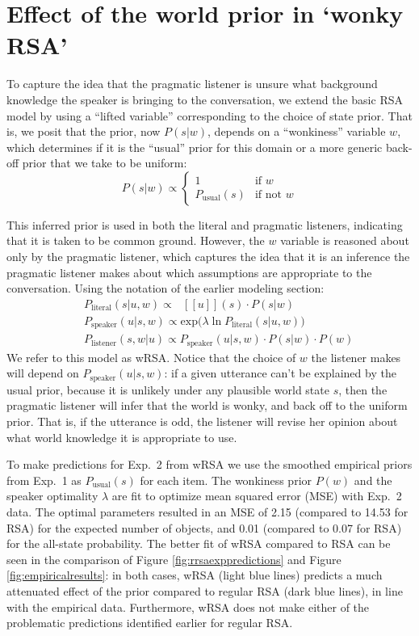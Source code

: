\documentclass[10pt,letterpaper]{article}
\newcommand{\denote}[1]{\mbox{ $[\![ #1 ]\!]$}}
\newcommand{\figref}[1]{Figure \ref{#1}}
\begin{document}
\section{Effect of the world prior in `wonky RSA'}

To capture the idea that the pragmatic listener is unsure what background knowledge the speaker is bringing to the conversation, we extend the basic RSA model by using a ``lifted variable'' \cite{goodmanlassiter,lassiter2013,bergengoodman2012,kao2014} corresponding to the choice of state prior. That is, we posit that the prior, now $P(s|w)$, depends on a ``wonkiness'' variable $w$, which determines if it is the ``usual'' prior for this domain or a more generic back-off prior that we take to be uniform:
$$
P(s|w) \propto \begin{cases}
1  & \text{if } w\\
   P_{\text{usual}}(s) & \text{if not } w
  \end{cases}
  $$
  
This inferred prior is used in both the literal and pragmatic listeners, indicating that it is taken to be common ground. However, the $w$ variable is reasoned about only by the pragmatic listener, which captures the idea that it is an inference the pragmatic listener makes about which assumptions are appropriate to the conversation. Using the notation of the earlier modeling section:
\begin{eqnarray}
&&P_{\textrm{literal}}(s|u,w)\propto \denote{u}(s) \cdot P(s|w)\\
&&P_{\textrm{speaker}}(u|s,w) \propto \mathrm{exp}({\lambda \ln P_{\textrm{literal}}(s|u,w))}\\
&&P_{\textrm{listener}}(s,w|u)\propto P_{\textrm{speaker}}(u|s,w)\cdot P(s|w) \cdot P(w)
\end{eqnarray}
We refer to this model as wRSA. Notice that the choice of $w$ the listener makes will depend on $P_{\textrm{speaker}}(u|s,w)$: if a given utterance can't be explained by the usual prior, because it is unlikely under any plausible world state $s$, then the pragmatic listener will infer that the world is wonky, and back off to the uniform prior.
That is, if the utterance is odd, the listener will revise her opinion about what world knowledge it is appropriate to use.

To make predictions for Exp.~2 from wRSA we use the smoothed empirical priors from Exp.~1 as $P_{\text{usual}}(s)$ for each item. The wonkiness prior $P(w)$ and the speaker optimality $\lambda$ are fit to optimize mean squared error (MSE) with Exp.~2 data. The optimal parameters resulted in an MSE of 2.15 (compared to 14.53 for RSA) for the expected number of objects, and 0.01 (compared to 0.07 for RSA) for the all-state probability. The better fit of wRSA compared to RSA can be seen in the comparison of \figref{fig:rrsaexppredictions} and \figref{fig:empiricalresults}: in both cases, wRSA (light blue lines) predicts a much attenuated effect of the prior compared to regular RSA (dark blue lines), in line with the empirical data. Furthermore, wRSA does not make either of the problematic predictions identified earlier for regular RSA.
\end{document}
